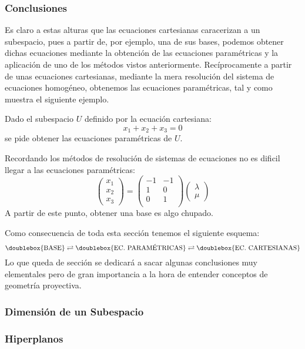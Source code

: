 \subsubsection{Conclusiones}
Es claro a estas alturas que las ecuaciones cartesianas caracerizan a un subespacio, pues a partir de, por ejemplo, una de sus bases, podemos obtener dichas ecuaciones mediante la obtención de las ecuaciones paramétricas y la aplicación de uno de los métodos vistos anteriormente. Recíprocamente a partir de unas ecuaciones cartesianas, mediante la mera resolución del sistema de ecuaciones homogéneo, obtenemos las ecuaciones paramétricas, tal y como muestra el siguiente ejemplo.
\begin{exa}
	Dado el subespacio $U$ definido por la ecuación cartesiana: \[x_1+x_2+x_3=0\] se pide obtener las ecuaciones paramétricas de $U$.
	
	Recordando los métodos de resolución de sistemas de ecuaciones no es dificil llegar a las ecuaciones paramétricas:
	\[\begin{pmatrix}
		x_1\\
		x_2\\
		x_3
	\end{pmatrix}=\begin{pmatrix}
	-1 & -1\\
	1 & 0\\
	0 & 1\\
	\end{pmatrix}\begin{pmatrix}
	\lambda\\
	\mu
	\end{pmatrix}\]
	A partir de este punto, obtener una base es algo chupado.
\end{exa}
Como consecuencia de toda esta sección tenemos el siguiente esquema:
\begin{equation}
	\doublebox{\textrm{BASE}}\bs{\rightleftarrows}\doublebox{\textrm{EC. PARAMÉTRICAS}}\bs{\rightleftarrows}\doublebox{\textrm{EC. CARTESIANAS}}
\end{equation}
Lo que queda de sección se dedicará a sacar algunas conclusiones muy elementales pero de gran importancia a la hora de entender conceptos de geometría proyectiva.
\subsubsection{Dimensión de un Subespacio}
\subsubsection{Hiperplanos}